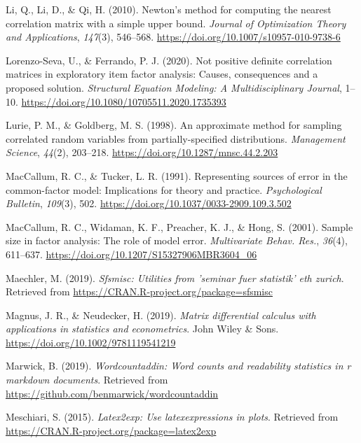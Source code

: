 \documentclass[
  english,
  man]{apa6}
\begin{document}
\leavevmode\hypertarget{ref-li2010}{}%
Li, Q., Li, D., \& Qi, H. (2010). Newton's method for computing the nearest correlation matrix with a simple upper bound. \emph{Journal of Optimization Theory and Applications}, \emph{147}(3), 546--568. \url{https://doi.org/10.1007/s10957-010-9738-6}

\leavevmode\hypertarget{ref-lorenzoseva2020}{}%
Lorenzo-Seva, U., \& Ferrando, P. J. (2020). Not positive definite correlation matrices in exploratory item factor analysis: Causes, consequences and a proposed solution. \emph{Structural Equation Modeling: A Multidisciplinary Journal}, 1--10. \url{https://doi.org/10.1080/10705511.2020.1735393}

\leavevmode\hypertarget{ref-lurie1998}{}%
Lurie, P. M., \& Goldberg, M. S. (1998). An approximate method for sampling correlated random variables from partially-specified distributions. \emph{Management Science}, \emph{44}(2), 203--218. \url{https://doi.org/10.1287/mnsc.44.2.203}

\leavevmode\hypertarget{ref-maccallum1991representing}{}%
MacCallum, R. C., \& Tucker, L. R. (1991). Representing sources of error in the common-factor model: Implications for theory and practice. \emph{Psychological Bulletin}, \emph{109}(3), 502. \url{https://doi.org/10.1037/0033-2909.109.3.502}

\leavevmode\hypertarget{ref-maccallum2001}{}%
MacCallum, R. C., Widaman, K. F., Preacher, K. J., \& Hong, S. (2001). Sample size in factor analysis: The role of model error. \emph{Multivariate Behav. Res.}, \emph{36}(4), 611--637. \url{https://doi.org/10.1207/S15327906MBR3604_06}

\leavevmode\hypertarget{ref-R-sfsmisc}{}%
Maechler, M. (2019). \emph{Sfsmisc: Utilities from 'seminar fuer statistik' eth zurich}. Retrieved from \url{https://CRAN.R-project.org/package=sfsmisc}

\leavevmode\hypertarget{ref-magnus2019matrix}{}%
Magnus, J. R., \& Neudecker, H. (2019). \emph{Matrix differential calculus with applications in statistics and econometrics}. John Wiley \& Sons. \url{https://doi.org/10.1002/9781119541219}

\leavevmode\hypertarget{ref-R-wordcountaddin}{}%
Marwick, B. (2019). \emph{Wordcountaddin: Word counts and readability statistics in r markdown documents}. Retrieved from \url{https://github.com/benmarwick/wordcountaddin}

\leavevmode\hypertarget{ref-R-latex2exp}{}%
Meschiari, S. (2015). \emph{Latex2exp: Use latexexpressions in plots}. Retrieved from \url{https://CRAN.R-project.org/package=latex2exp}
\end{document}
